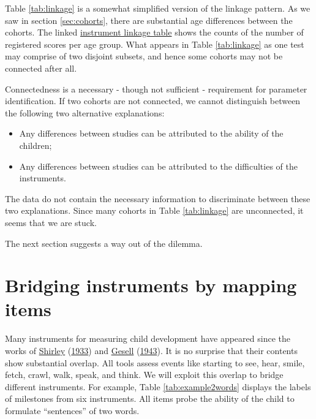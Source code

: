\documentclass[
]{book}
\providecommand{\tightlist}{%
  \setlength{\itemsep}{0pt}\setlength{\parskip}{0pt}}
\begin{document}
Table \ref{tab:linkage} is a somewhat simplified version of the linkage pattern. As we saw in section \ref{sec:cohorts}, there are substantial age differences between the cohorts. The linked \href{https://tnochildhealthstatistics.shinyapps.io/GCDG_instrument_linkage/}{instrument linkage table} shows the counts of the number of registered scores per age group. What appears in Table \ref{tab:linkage} as one test may comprise of two disjoint subsets, and hence some cohorts may not be connected after all.

Connectedness is a necessary - though not sufficient - requirement for parameter identification. If two cohorts are not connected, we cannot distinguish between the following two alternative explanations:

\begin{itemize}
\tightlist
\item
  Any differences between studies can be attributed to the ability of the children;
\item
  Any differences between studies can be attributed to the difficulties of the instruments.
\end{itemize}

The data do not contain the necessary information to discriminate between these two explanations. Since many cohorts in Table \ref{tab:linkage} are unconnected, it seems that we are stuck.

The next section suggests a way out of the dilemma.

\hypertarget{sec:mapping}{%
\section{Bridging instruments by mapping items}\label{sec:mapping}}

Many instruments for measuring child development have appeared since the works of \protect\hyperlink{ref-shirley1933}{Shirley} (\protect\hyperlink{ref-shirley1933}{1933}) and \protect\hyperlink{ref-gesell1943}{Gesell} (\protect\hyperlink{ref-gesell1943}{1943}). It is no surprise that their contents show substantial overlap. All tools assess events like starting to see, hear, smile, fetch, crawl, walk, speak, and think. We will exploit this overlap to bridge different instruments. For example, Table \ref{tab:example2words} displays the labels of milestones from six instruments. All items probe the ability of the child to formulate ``sentences'' of two words.

\providecommand{\docline}[3]{\noalign{\global\setlength{\arrayrulewidth}{#1}}\arrayrulecolor[HTML]{#2}\cline{#3}}
\end{document}
